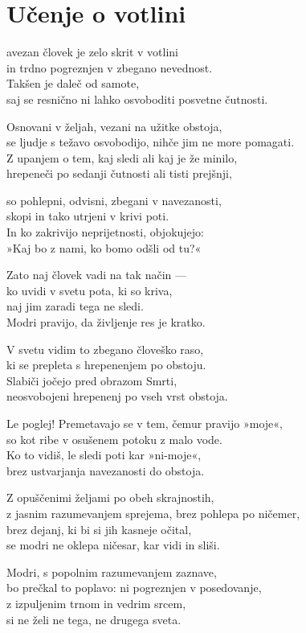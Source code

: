 \cleartorecto
{}
\chapter{Učenje o votlini}

avezan človek je zelo skrit v votlini\\
in trdno pogreznjen v zbegano nevednost.\\
Takšen je daleč od samote,\\
saj se resnično ni lahko osvoboditi posvetne čutnosti.

Osnovani v željah, vezani na užitke obstoja,\\
se ljudje s težavo osvobodijo, nihče jim ne more pomagati.\\
Z upanjem o tem, kaj sledi ali kaj je že minilo,\\
hrepeneči po sedanji čutnosti ali tisti prejšnji,

so pohlepni, odvisni, zbegani v navezanosti,\\
skopi in tako utrjeni v krivi poti.\\
In ko zakrivijo neprijetnosti, objokujejo:\\
»Kaj bo z nami, ko bomo odšli od tu?«

Zato naj človek vadi na tak način —\\
ko uvidi v svetu pota, ki so kriva,\\
naj jim zaradi tega ne sledi.\\
Modri pravijo, da življenje res je kratko.

\clearpage

V svetu vidim to zbegano človeško raso,\\
ki se prepleta s hrepenenjem po obstoju.\\
Slabiči jočejo pred obrazom Smrti,\\
neosvobojeni hrepenenj po vseh vrst obstoja.

Le poglej! Premetavajo se v tem, čemur pravijo »moje«,\\
so kot ribe v osušenem potoku z malo vode.\\
Ko to vidiš, le sledi poti kar »ni-moje«,\\
brez ustvarjanja navezanosti do obstoja.

Z opuščenimi željami po obeh skrajnostih,\\
z jasnim razumevanjem sprejema, brez pohlepa po ničemer,\\
brez dejanj, ki bi si jih kasneje očital,\\
se modri ne oklepa ničesar, kar vidi in sliši.

Modri, s popolnim razumevanjem zaznave,\\
bo prečkal to poplavo: ni pogreznjen v posedovanje,\\
z izpuljenim trnom in vedrim srcem,\\
si ne želi ne tega, ne drugega sveta.


